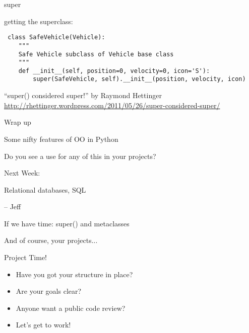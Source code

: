 \documentclass{beamer}
\begin{document}
\begin{frame}[fragile]{super}

{\Large getting the superclass:}
\begin{verbatim}
￼class SafeVehicle(Vehicle):
    """
    Safe Vehicle subclass of Vehicle base class
    """
    def __init__(self, position=0, velocity=0, icon='S'):
        super(SafeVehicle, self).__init__(position, velocity, icon)
\end{verbatim}

\vfill
{\Large ``super() considered super!'' by Raymond Hettinger }
\vfill
\url{http://rhettinger.wordpress.com/2011/05/26/super-considered-super/}
\end{frame} 









\begin{frame}[fragile]{Wrap up}

\vfill
{\Large Some nifty features of OO in Python}

\vfill
{\Large Do you see a use for any of this in your projects?}

\vfill

\end{frame}

\begin{frame}[fragile]{Next Week:}

\vfill
{\LARGE Relational databases, SQL}

{\Large  -- Jeff}

\vfill
{\Large  If we have time: super() and  metaclasses}


\vfill
{\Large And of course, your projects...}

\vfill

\end{frame}

\begin{frame}[fragile]{Project Time!}

\begin{itemize}
    \item Have you got your structure in place? 
    \item Are your goals clear?
    \item Anyone want a public code review?
    \item Let's get to work!
\end{itemize}

\end{frame}
\end{document}
